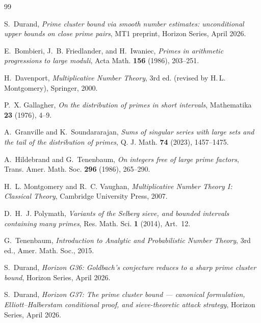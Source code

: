 \documentclass[11pt,reqno]{amsart}
\theoremstyle{plain}
\theoremstyle{definition}
\theoremstyle{remark}
\begin{document}
\begin{thebibliography}{99}

S.~Durand,
\emph{Prime cluster bound via smooth number estimates:
unconditional upper bounds on close prime pairs},
MT1 preprint, Horizon Series, April 2026.

E.~Bombieri, J.~B. Friedlander, and H.~Iwaniec,
\emph{Primes in arithmetic progressions to large moduli},
Acta Math. \textbf{156} (1986), 203--251.

H.~Davenport,
\emph{Multiplicative Number Theory},
3rd ed. (revised by H.\,L. Montgomery),
Springer, 2000.

P.~X. Gallagher,
\emph{On the distribution of primes in short intervals},
Mathematika \textbf{23} (1976), 4--9.

A.~Granville and K.~Soundararajan,
\emph{Sums of singular series with large sets and the tail of the
distribution of primes},
Q. J. Math. \textbf{74} (2023), 1457--1475.

A.~Hildebrand and G.~Tenenbaum,
\emph{On integers free of large prime factors},
Trans. Amer. Math. Soc. \textbf{296} (1986), 265--290.

H.~L. Montgomery and R.~C. Vaughan,
\emph{Multiplicative Number Theory I: Classical Theory},
Cambridge University Press, 2007.

D.~H.~J. Polymath,
\emph{Variants of the Selberg sieve, and bounded intervals containing
many primes},
Res. Math. Sci. \textbf{1} (2014), Art.~12.

G.~Tenenbaum,
\emph{Introduction to Analytic and Probabilistic Number Theory},
3rd ed., Amer. Math. Soc., 2015.

S.~Durand,
\emph{Horizon G36: Goldbach's conjecture reduces to a sharp prime
cluster bound},
Horizon Series, April 2026.

S.~Durand,
\emph{Horizon G37: The prime cluster bound --- canonical formulation,
Elliott--Halberstam conditional proof, and sieve-theoretic attack
strategy},
Horizon Series, April 2026.

\end{thebibliography}
\end{document}
